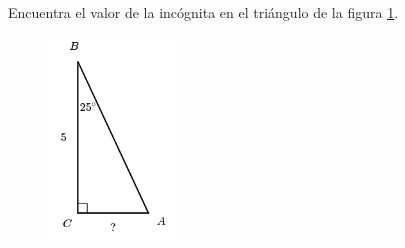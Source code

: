 Encuentra el valor de la incógnita en el triángulo de la figura \ref{fig:lados_functrig_20}.
\begin{figure}[H]
    \begin{center}
        \includegraphics[width=0.3\textwidth]{../images/lados_functrig_20.png}
    \end{center}
    \caption{}
    \label{fig:lados_functrig_20}
\end{figure}